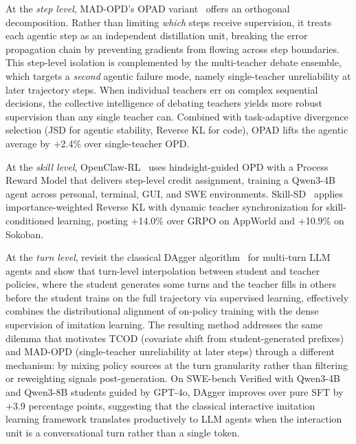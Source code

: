 \documentclass{article} %
\begin{document}
At the \emph{step level}, MAD-OPD's OPAD variant~\citep{2605.01347} offers an orthogonal decomposition. Rather than limiting \emph{which} steps receive supervision, it treats each agentic step as an independent distillation unit, breaking the error propagation chain by preventing gradients from flowing across step boundaries. This step-level isolation is complemented by the multi-teacher debate ensemble, which targets a \emph{second} agentic failure mode, namely single-teacher unreliability at later trajectory steps. When individual teachers err on complex sequential decisions, the collective intelligence of debating teachers yields more robust supervision than any single teacher can. Combined with task-adaptive divergence selection (JSD for agentic stability, Reverse KL for code), OPAD lifts the agentic average by +2.4\% over single-teacher OPD.

At the \emph{skill level}, OpenClaw-RL~\citep{2603.10165} uses hindsight-guided OPD with a Process Reward Model that delivers step-level credit assignment, training a Qwen3-4B agent across personal, terminal, GUI, and SWE environments. Skill-SD~\citep{2604.10674} applies importance-weighted Reverse KL with dynamic teacher synchronization for skill-conditioned learning, posting +14.0\% over GRPO on AppWorld and +10.9\% on Sokoban.

At the \emph{turn level}, \citet{2605.12913} revisit the classical DAgger algorithm~\citep{1011.0686} for multi-turn LLM agents and show that turn-level interpolation between student and teacher policies, where the student generates some turns and the teacher fills in others before the student trains on the full trajectory via supervised learning, effectively combines the distributional alignment of on-policy training with the dense supervision of imitation learning. The resulting method addresses the same dilemma that motivates TCOD (covariate shift from student-generated prefixes) and MAD-OPD (single-teacher unreliability at later steps) through a different mechanism: by mixing policy sources at the turn granularity rather than filtering or reweighting signals post-generation. On SWE-bench Verified with Qwen3-4B and Qwen3-8B students guided by GPT-4o, DAgger improves over pure SFT by +3.9 percentage points, suggesting that the classical interactive imitation learning framework translates productively to LLM agents when the interaction unit is a conversational turn rather than a single token.
\end{document}
